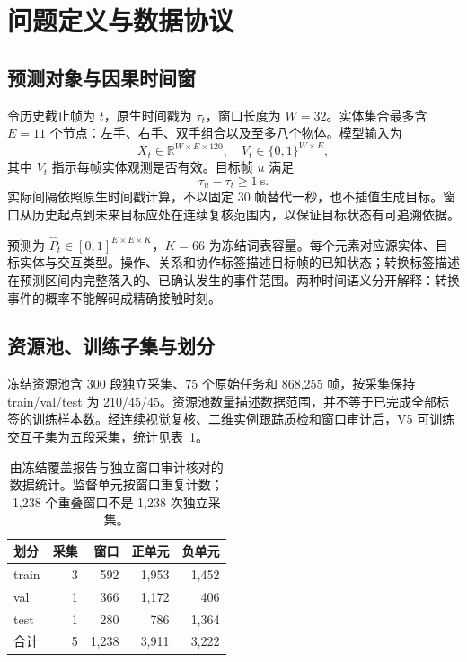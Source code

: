 \documentclass[10pt,twocolumn,letterpaper]{article}
\newcommand{\R}{\mathbb{R}}
\begin{document}
\section{问题定义与数据协议}
\subsection{预测对象与因果时间窗}
令历史截止帧为 $t$，原生时间戳为 $\tau_t$，窗口长度为 $W=32$。实体集合最多含 $E=11$ 个节点：左手、右手、双手组合以及至多八个物体。模型输入为
\begin{equation}
 X_t\in\R^{W\times E\times120},\quad
 V_t\in\{0,1\}^{W\times E},
\end{equation}
其中 $V_t$ 指示每帧实体观测是否有效。目标帧 $u$ 满足
\begin{equation}
 \tau_u-\tau_t\geq 1\ \mathrm{s}.
\end{equation}
实际间隔依照原生时间戳计算，不以固定 30 帧替代一秒，也不插值生成目标。窗口从历史起点到未来目标应处在连续复核范围内，以保证目标状态有可追溯依据。

预测为 $\hat P_t\in[0,1]^{E\times E\times K}$，$K=66$ 为冻结词表容量。每个元素对应源实体、目标实体与交互类型。操作、关系和协作标签描述目标帧的已知状态；转换标签描述在预测区间内完整落入的、已确认发生的事件范围。两种时间语义分开解释：转换事件的概率不能解码成精确接触时刻。

\subsection{资源池、训练子集与划分}
冻结资源池含 300 段独立采集、75 个原始任务和 868,255 帧，按采集保持 train/val/test 为 210/45/45。资源池数量描述数据范围，并不等于已完成全部标签的训练样本数。经连续视觉复核、二维实例跟踪质检和窗口审计后，V5 可训练交互子集为五段采集，统计见表~\ref{tab:data}。

\begin{table}[t]
\centering\small
\setlength{\tabcolsep}{4pt}
\begin{tabular}{lrrrr}
\toprule
划分 & 采集 & 窗口 & 正单元 & 负单元\\
\midrule
train & 3 & 592 & 1,953 & 1,452\\
val & 1 & 366 & 1,172 & 406\\
test & 1 & 280 & 786 & 1,364\\
\midrule
合计 & 5 & 1,238 & 3,911 & 3,222\\
\bottomrule
\end{tabular}
\caption{由冻结覆盖报告与独立窗口审计核对的数据统计。监督单元按窗口重复计数；1,238 个重叠窗口不是 1,238 次独立采集。}
\label{tab:data}
\end{table}
\end{document}
